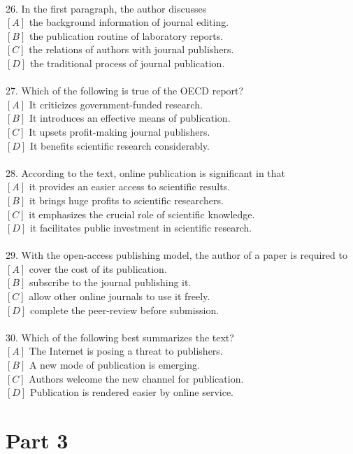 \documentclass[a4paper]{article}
\begin{document}
\\26.	In the first paragraph, the author discusses\\$[A]$ the background information of journal editing.\\$[B]$ the publication routine of laboratory reports.\\$[C]$ the relations of authors with journal publishers.\\$[D]$ the traditional process of journal publication.\\\\27.	Which of the following is true of the OECD report?\\$[A]$ It criticizes government-funded research.\\$[B]$ It introduces an effective means of publication.\\$[C]$ It upsets profit-making journal publishers.\\$[D]$ It benefits scientific research considerably.\\\\28.	According to the text, online publication is significant in that\\$[A]$ it provides an easier access to scientific results.\\$[B]$ it brings huge profits to scientific researchers.\\$[C]$ it emphasizes the crucial role of scientific knowledge.\\$[D]$ it facilitates public investment in scientific research.\\\\29.	With the open-access publishing model, the author of a paper is required to\\$[A]$ cover the cost of its publication.\\$[B]$ subscribe to the journal publishing it.\\$[C]$ allow other online journals to use it freely.\\$[D]$ complete the peer-review before submission.\\\\30.	Which of the following best summarizes the text?\\$[A]$ The Internet is posing a threat to publishers.\\$[B]$ A new mode of publication is emerging.\\$[C]$ Authors welcome the new channel for publication.\\$[D]$ Publication is rendered easier by online service.\\\section{Part 3}
\end{document}
